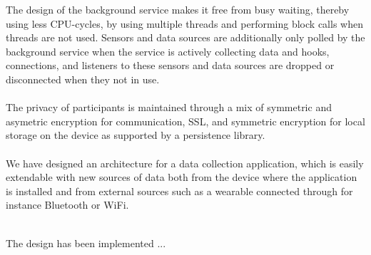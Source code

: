 The design of the background service makes it free from busy waiting, thereby using less CPU-cycles, by using multiple threads and performing block calls when threads are not used. Sensors and data sources are additionally only polled by the background service when the service is actively collecting data and hooks, connections, and listeners to these sensors and data sources are dropped or disconnected when they not in use.  
\\\\
The privacy of participants is maintained through a mix of symmetric and asymetric encryption for communication, SSL, and symmetric encryption for local storage on the device as supported by a persistence library. 
\\\\
We have designed an architecture for a data collection application, which is easily extendable with new sources of data both from the device where the application is installed and from external sources such as a wearable connected through for instance Bluetooth or WiFi.
\\\\






The design has been implemented ...
